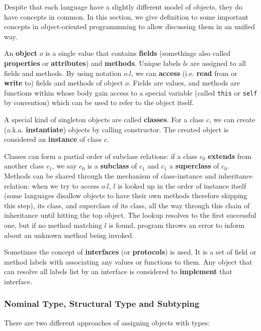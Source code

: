 Despite that each language have a slightly different model of objects, they do have concepts
in common.
In this section, we give definition to some important concepts in object-oriented programmming
to allow discussing them in an unified way.

An \textbf{object} $o$ is a single value that contains \textbf{fields} (somethings also called
\textbf{properties} or \textbf{attributes}) and \textbf{methods}.
Unique labels $l$s are assigned to all fields and methods. By using notation $o.l$, we can \textbf{access}
(i.e. \textbf{read} from or \textbf{write} to) fields and methods of object $o$.
Fields are values, and methods are functions within whose body gain access to a special variable
(called \texttt{this} or \texttt{self} by convention) which can be used to refer to the object itself.

A special kind of singleton objects are called \textbf{classes}.
For a class $c$, we can create (a.k.a. \textbf{instantiate}) objects by calling constructor.
The created object is considered an \textbf{instance} of class $c$.

Classes can form a partial order of subclass relations: if a class $c_0$ \textbf{extends} from
another class $c_1$, we say $c_0$ is a \textbf{subclass} of $c_1$ and $c_1$ a \textbf{superclass} of $c_0$.
Methods can be shared through the mechanism of class-instance and inheritance relation:
when we try to access $o.l$, $l$ is looked up in the order of instance itself (some languages disallow
objects to have their own methods therefore skipping this step), its class, and superclass of its class,
all the way through this chain of inheritance until hitting the top object.
The lookup resolves to the first successful one,
but if no method matching $l$ is found, program throws an error to inform about an unknown method being invoked.

Sometimes the concept of \textbf{interfaces} (or \textbf{protocols}) is used. It is a set of
field or method labels with associating any values or functions to them.
Any object that can resolve all labels list by an interface is considered to
\textbf{implement} that interface.

\subsubsection{Nominal Type, Structural Type and Subtyping}

There are two different approaches of assigning objects with types:

